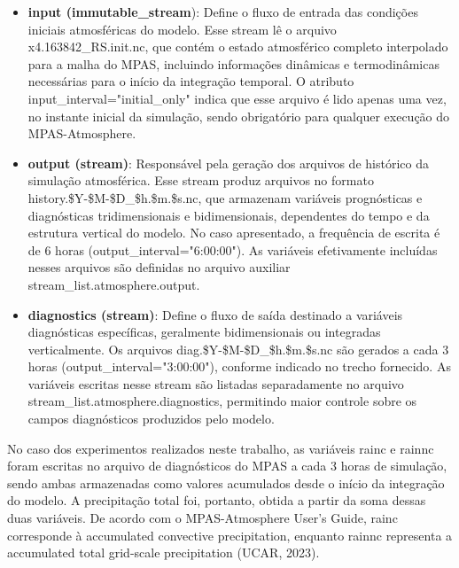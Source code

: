 \documentclass[12pt,a4paper,oneside]{book}
\begin{document}
\begin{itemize}
\item
  \textbf{input (immutable\_stream}): Define o fluxo de entrada das condições iniciais atmosféricas do modelo. Esse stream lê o arquivo x4.163842\_RS.init.nc, que contém o estado atmosférico completo interpolado para a malha do MPAS, incluindo informações dinâmicas e termodinâmicas necessárias para o início da integração temporal. O atributo input\_interval="initial\_only" indica que esse arquivo é lido apenas uma vez, no instante inicial da simulação, sendo obrigatório para qualquer execução do MPAS-Atmosphere.
\item
  \textbf{output (stream)}: Responsável pela geração dos arquivos de histórico da simulação atmosférica. Esse stream produz arquivos no formato history.\$Y-\$M-\$D\_\$h.\$m.\$s.nc, que armazenam variáveis prognósticas e diagnósticas tridimensionais e bidimensionais, dependentes do tempo e da estrutura vertical do modelo. No caso apresentado, a frequência de escrita é de 6 horas (output\_interval="6:00:00"). As variáveis efetivamente incluídas nesses arquivos são definidas no arquivo auxiliar stream\_list.atmosphere.output.
\item
  \textbf{diagnostics (stream)}: Define o fluxo de saída destinado a variáveis diagnósticas específicas, geralmente bidimensionais ou integradas verticalmente. Os arquivos diag.\$Y-\$M-\$D\_\$h.\$m.\$s.nc são gerados a cada 3 horas (output\_interval="3:00:00"), conforme indicado no trecho fornecido. As variáveis escritas nesse stream são listadas separadamente no arquivo stream\_list.atmosphere.diagnostics, permitindo maior controle sobre os campos diagnósticos produzidos pelo modelo.
\end{itemize}

No caso dos experimentos realizados neste trabalho, as variáveis rainc e rainnc foram escritas no arquivo de diagnósticos do MPAS a cada 3 horas de simulação, sendo ambas armazenadas como valores acumulados desde o início da integração do modelo. A precipitação total foi, portanto, obtida a partir da soma dessas duas variáveis. De acordo com o MPAS-Atmosphere User's Guide, rainc corresponde à accumulated convective precipitation, enquanto rainnc representa a accumulated total grid-scale precipitation (UCAR, 2023).
\end{document}
